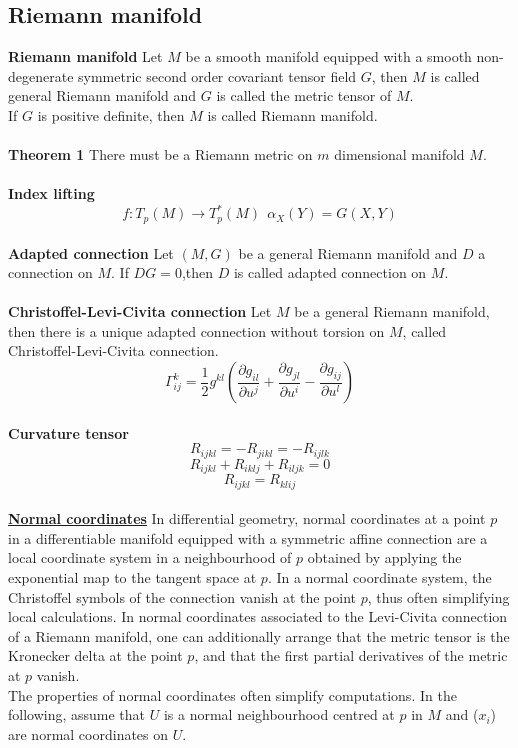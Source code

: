 \documentclass{article}
\begin{document}
\subsection{Riemann manifold}
\textbf{Riemann manifold} Let $M$ be a smooth manifold equipped with a smooth non-degenerate symmetric second order covariant tensor field $G$, then $M$ is called general Riemann manifold and $G$ is called the metric tensor of $M$.\\
If $G$ is positive definite, then $M$ is called Riemann manifold.\\ \\
\textbf{Theorem 1} There must be a Riemann metric on $m$ dimensional manifold $M$.\\ \\
\textbf{Index lifting}\\
\[f:T_p(M) \to T^*_p(M) \ \ \alpha_X(Y) = G(X,Y)\]\\
\textbf{Adapted connection} Let $(M,G)$ be a general Riemann manifold and $D$ a connection on $M$. If $DG=0$,then $D$ is called adapted connection on $M$. \\ \\
\textbf{Christoffel-Levi-Civita connection} Let $M$ be a general Riemann manifold, then there is a unique adapted connection without torsion on $M$, called Christoffel-Levi-Civita connection.
\[\Gamma^{k}_{ij} = \frac{1}{2} g^{kl}(\frac{\partial g_{il}}{\partial u^j} + \frac{\partial g_{jl}}{\partial u^i} - \frac{\partial g_{ij}}{\partial u^l})\]\\
\textbf{Curvature tensor}\\
\[R_{ijkl} = -R_{jikl} = -R_{ijlk}\]
\[R_{ijkl}+R_{iklj}+R_{iljk}=0\]
\[R_{ijkl} = R_{klij}\]\\
\href{https://en.wikipedia.org/wiki/Normal_coordinates}{\textbf{Normal coordinates}}  In differential geometry, normal coordinates at a point $p$ in a differentiable manifold equipped with a symmetric affine connection are a local coordinate system in a neighbourhood of $p$ obtained by applying the exponential map to the tangent space at $p$. In a normal coordinate system, the Christoffel symbols of the connection vanish at the point $p$, thus often simplifying local calculations. In normal coordinates associated to the Levi-Civita connection of a Riemann manifold, one can additionally arrange that the metric tensor is the Kronecker delta at the point $p$, and that the first partial derivatives of the metric at $p$ vanish.\\
The properties of normal coordinates often simplify computations. In the following, assume that $U$ is a normal neighbourhood centred at $p$ in $M$ and ($x_i$) are normal coordinates on $U$.\\
\end{document}
